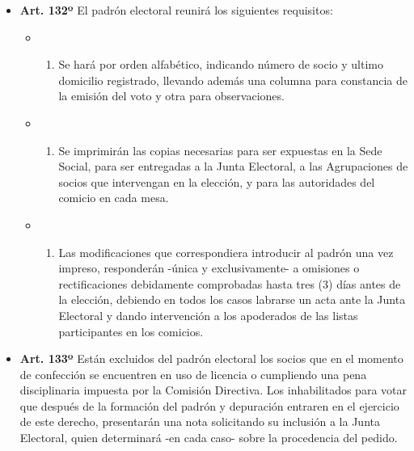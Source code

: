 \documentclass[]{book}
\providecommand{\tightlist}{%
  \setlength{\itemsep}{0pt}\setlength{\parskip}{0pt}}
\begin{document}
\begin{itemize}
\tightlist
\item
  \textbf{Art. 132º}
  El padrón electoral reunirá los siguientes requisitos:

  \begin{itemize}
  \item
    \begin{enumerate}
    \def\labelenumi{\alph{enumi})}
    \tightlist
    \item
      Se hará por orden alfabético, indicando número de socio y ultimo domicilio registrado, llevando además una columna para constancia de la emisión del voto y otra para observaciones.
    \end{enumerate}
  \item
    \begin{enumerate}
    \def\labelenumi{\alph{enumi})}
    \setcounter{enumi}{1}
    \tightlist
    \item
      Se imprimirán las copias necesarias para ser expuestas en la Sede Social, para ser entregadas a la Junta Electoral, a las Agrupaciones de socios que intervengan en la elección, y para las autoridades del comicio en cada mesa.
    \end{enumerate}
  \item
    \begin{enumerate}
    \def\labelenumi{\alph{enumi})}
    \setcounter{enumi}{2}
    \tightlist
    \item
      Las modificaciones que correspondiera introducir al padrón una vez impreso, responderán -única y exclusivamente- a omisiones o rectificaciones debidamente comprobadas hasta tres (3) días antes de la elección, debiendo en todos los casos labrarse un acta ante la Junta Electoral y dando intervención a los apoderados de las listas participantes en los comicios.
    \end{enumerate}
  \end{itemize}
\end{itemize}

\begin{itemize}
\tightlist
\item
  \textbf{Art. 133º}
  Están excluidos del padrón electoral los socios que en el momento de confección se encuentren en uso de licencia o cumpliendo una pena disciplinaria impuesta por la Comisión Directiva. Los inhabilitados para votar que después de la formación del padrón y depuración entraren en el ejercicio de este derecho, presentarán una nota solicitando su inclusión a la Junta Electoral, quien determinará -en cada caso- sobre la procedencia del pedido.
\end{itemize}
\end{document}
